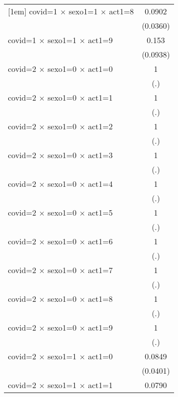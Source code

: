 {\begin{tabular}{l*{1}{c}}
[1em]
covid=1 $\times$ sexo1=1 $\times$ act1=8&      0.0902\sym{***}\\
                    &    (0.0360)         \\
[1em]
covid=1 $\times$ sexo1=1 $\times$ act1=9&       0.153\sym{**} \\
                    &    (0.0938)         \\
[1em]
covid=2 $\times$ sexo1=0 $\times$ act1=0&           1         \\
                    &         (.)         \\
[1em]
covid=2 $\times$ sexo1=0 $\times$ act1=1&           1         \\
                    &         (.)         \\
[1em]
covid=2 $\times$ sexo1=0 $\times$ act1=2&           1         \\
                    &         (.)         \\
[1em]
covid=2 $\times$ sexo1=0 $\times$ act1=3&           1         \\
                    &         (.)         \\
[1em]
covid=2 $\times$ sexo1=0 $\times$ act1=4&           1         \\
                    &         (.)         \\
[1em]
covid=2 $\times$ sexo1=0 $\times$ act1=5&           1         \\
                    &         (.)         \\
[1em]
covid=2 $\times$ sexo1=0 $\times$ act1=6&           1         \\
                    &         (.)         \\
[1em]
covid=2 $\times$ sexo1=0 $\times$ act1=7&           1         \\
                    &         (.)         \\
[1em]
covid=2 $\times$ sexo1=0 $\times$ act1=8&           1         \\
                    &         (.)         \\
[1em]
covid=2 $\times$ sexo1=0 $\times$ act1=9&           1         \\
                    &         (.)         \\
[1em]
covid=2 $\times$ sexo1=1 $\times$ act1=0&      0.0849\sym{***}\\
                    &    (0.0401)         \\
[1em]
covid=2 $\times$ sexo1=1 $\times$ act1=1&      0.0790\sym{***}\\

\end{tabular}}

